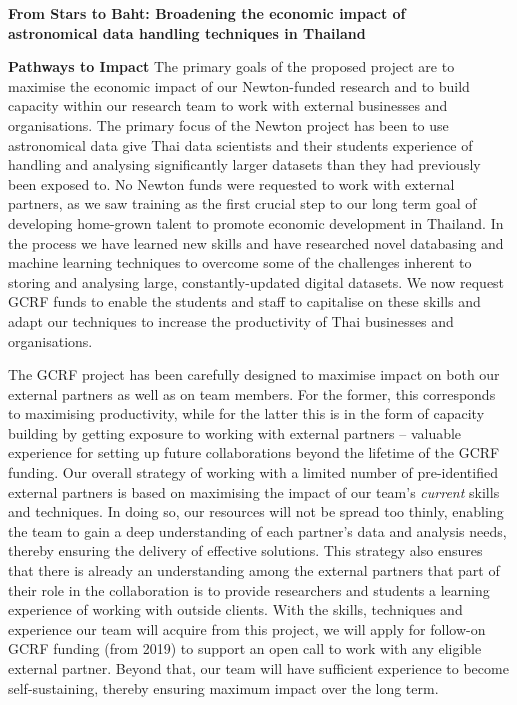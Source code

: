 \documentclass[11pt]{article}
\begin{document}
  \setcounter{figure}{0}
  \noindent
  {\LARGE \bf From Stars to Baht: Broadening the economic impact of \\
  astronomical data handling techniques in Thailand}
  
  \vspace{3mm}
  \noindent
  {\LARGE \bf Pathways to Impact}
  \vspace{3mm}
  \noindent
  The primary goals of the proposed project are to maximise the economic impact of our Newton-funded research and to build capacity within our research team to work with external businesses and organisations. The primary focus of the Newton project has been to use astronomical data give Thai data scientists and their students experience of handling and analysing significantly larger datasets than they had previously been exposed to. No Newton funds were requested to work with external partners, as we saw training as the first crucial step to our long term goal of developing home-grown talent to promote economic development in Thailand. In the process we have learned new skills and have researched novel databasing and machine learning techniques to overcome some of the challenges inherent to storing and analysing large, constantly-updated digital datasets. We now request GCRF funds to enable the students and staff to capitalise on these skills and adapt our techniques to increase the productivity of Thai businesses and organisations.  
  
  \vspace{2mm}
  \noindent
  The GCRF project has been carefully designed to maximise impact on both our external partners as well as on team members. For the former, this corresponds to maximising productivity, while for the latter this is in the form of capacity building by getting exposure to working with external partners -- valuable experience for setting up future collaborations beyond the lifetime of the GCRF funding. Our overall strategy of working with a limited number of pre-identified external partners is based on maximising the impact of our team's {\it current} skills and techniques. In doing so, our resources will not be spread too thinly, enabling the team to gain a deep understanding of each partner's data and analysis needs, thereby ensuring the delivery of effective solutions. This strategy also ensures that there is already an understanding among the external partners that part of their role in the collaboration is to provide researchers and students a learning experience of working with outside clients. With the skills, techniques and experience our team will acquire from this project, we will apply for follow-on GCRF funding (from 2019) to support an open call to work with any eligible external partner. Beyond that, our team will have sufficient experience to become self-sustaining, thereby ensuring maximum impact over the long term.
  
\end{document}
